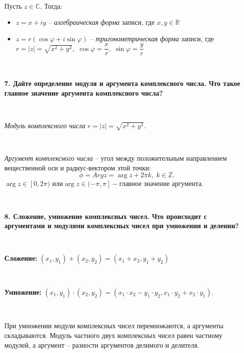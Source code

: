 \documentclass{article}
\begin{document}
	{
		$\;$
		\setlength{\parindent}{0.4cm}
		\hangindent=0.4cm
		
		Пусть $z \in \mathbb{C}$. Тогда:
		\begin{itemize}
		
		
		\item $z=x+iy$ -- \textit{алгебраическая} \textit{форма} записи, где $x, y\in\mathbb{R}$
		
		\item $z=r(\cos\varphi+i\sin\varphi)$ -- \textit{тригонометрическая} \textit{форма} записи, где $r=|z|=\sqrt{x^2+y^2},$ $ \cos\varphi=\dfrac{x}{r}, \; \sin\varphi=\dfrac{y}{r}$\\
		\end{itemize}
		
		$\;$
		\setlength{\parindent}{0cm}
		\hangindent=0cm
	}
	
	\textbf{7. Дайте определение модуля и аргумента комплексного числа. Что такое главное значение аргумента комплексного числа?} 
	
	{
		$\;$
		\setlength{\parindent}{0.4cm}
		\hangindent=0.4cm
		
		\textit{Модуль комплексного числа} $r=|z|=\sqrt{x^2+y^2}$.
		
		$\;$
		
		 \textit{Аргумент комплексного числа} -- угол между положительным направлением вещественной оси и радиус-вектором этой точки:
		$$\phi=Arg z=\arg z+2\pi k, \; k\in \mathbb{Z}.$$
		$ \arg z\in[\left. 0, 2\pi\right.) \text{ или} \arg z\in (\left.-\pi, \pi \right. ] - \text{главное значение аргумента}.$
		
		$\;$
		\setlength{\parindent}{0cm}
		\hangindent=0cm
	}
	
	\textbf{8. Сложение, умножение комплексных чисел. Что происходит с аргументами и модулями комплексных чисел при умножении и делении?} 
	
	{
		$\;$
		\setlength{\parindent}{0.4cm}
		\hangindent=0.4cm
		
		\textbf{Сложение:} $ (x_1, y_1)+(x_2, y_2)=(x_1+x_2, y_1+y_2)$ 
		
		$\;$
		
		\textbf{Умножение:} $(x_1, y_1)\cdot(x_2, y_2)=(x_1\cdot x_2-y_1\cdot y_2, x_1\cdot y_2+x_2\cdot y_1)$. 
		
		$\;$
		
		При умножении модули комплексных чисел перемножаются, а аргументы складываются. Модуль частного двух комплексных чисел равен частному модулей, а аргумент -- разности аргументов делимого и делителя.
		
		$\;$
		\setlength{\parindent}{0cm}
		\hangindent=0cm
	}
	
\end{document}
